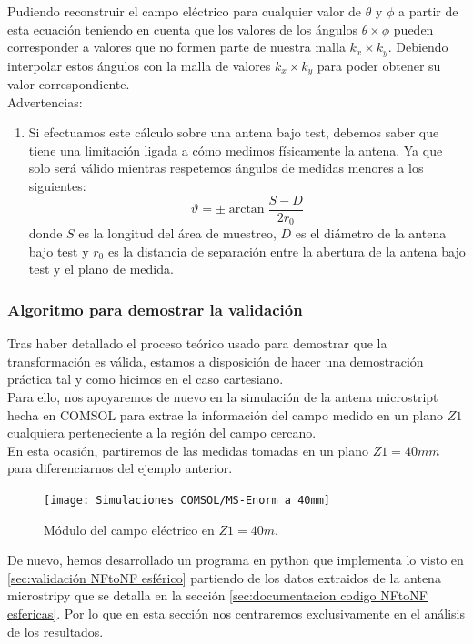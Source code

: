 \documentclass{article}
\begin{document}
Pudiendo reconstruir el campo eléctrico para cualquier valor de $\theta$ y $\phi$ a partir de esta ecuación teniendo en cuenta que los valores de los ángulos $\theta \times \phi$ pueden corresponder a valores que no formen parte de nuestra malla $k_{x}\times k_{y}$. Debiendo interpolar estos ángulos con la malla de valores  $k_{x}\times k_{y}$  para poder obtener su valor correspondiente.
\\

Advertencias:
\begin{enumerate}
\item Si efectuamos este cálculo sobre una antena bajo test, debemos saber que tiene una limitación ligada a cómo medimos físicamente la antena. Ya que solo será válido mientras respetemos ángulos de medidas menores a los siguientes:
\begin{equation}
\vartheta = \pm\arctan \frac{S-D}{2r_{0}}
\end{equation}
donde $S$ es la longitud del área de muestreo, $D$ es el diámetro de la antena bajo test y $r_ {0}$ es la distancia de separación entre la abertura de la antena bajo test y el plano de medida.
\end{enumerate}

\newpage

\subsubsection{Algoritmo para demostrar la validación}
Tras haber detallado el proceso teórico usado para demostrar que la transformación es válida, estamos a disposición de hacer una demostración práctica tal y como hicimos en el caso cartesiano.\\
Para ello, nos apoyaremos de nuevo en la simulación de la antena microstript hecha en COMSOL para extrae la información del campo medido en un plano $Z1$ cualquiera perteneciente a la región del campo cercano.\\

En esta ocasión, partiremos de las medidas tomadas en un plano $Z1 = 40mm$ para diferenciarnos del ejemplo anterior. 

\begin{figure}[h]
  \centering
    \texttt{[image: Simulaciones COMSOL/MS-Enorm a 40mm]}
    \caption{Módulo del campo eléctrico en $Z1 = 40m$.}
    \label{MS-Modulo del campo eléctrico en Z1}
\end{figure}

De nuevo, hemos desarrollado un programa en python que implementa lo visto en \ref{sec:validación NFtoNF esférico} partiendo de los datos extraidos de la antena microstripy que se detalla en la sección \ref{sec:documentacion codigo NFtoNF esfericas}. Por lo que en esta sección nos centraremos exclusivamente en el análisis de los resultados. \\
\end{document}
